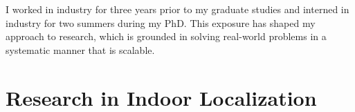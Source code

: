 \documentclass[10pt]{article}
\begin{document}
I worked in industry for three years prior to my graduate studies and interned in industry for two summers during my PhD. This exposure has shaped my approach to research, which is grounded in solving real-world problems in a systematic manner that is scalable.  









\section{Research in Indoor Localization}
\end{document}
